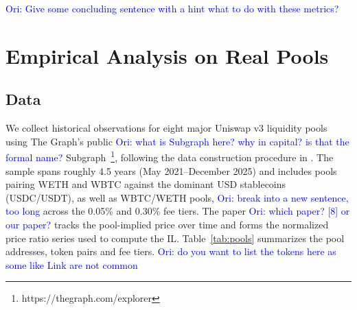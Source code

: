 \documentclass[journal]{IEEEtran}
\newcommand{\ori}[1]{\textcolor{blue}{Ori: #1}}
\begin{document}
\ori{Give some concluding sentence with a hint what to do with these metrics?}

\section{Empirical Analysis on Real Pools}
\label{sec:empirical_analysis}

\subsection{Data}


\begin{table}[t]
\centering
\scriptsize
{}
\caption{Summary of Uniswap v3 pools used in the empirical analysis.}
\label{tab:pools}
\end{table}


We collect historical observations for eight major Uniswap v3 liquidity pools using The Graph's public \ori{what is Subgraph here? why in capital? is that the formal name?} Subgraph~\footnote{https://thegraph.com/explorer}, following the data construction procedure in \cite{loesch2021impermanent}. 
The sample spans roughly 4.5 years (May 2021--December 2025) and includes pools pairing WETH and WBTC against the dominant USD stablecoins (USDC/USDT), as well as WBTC/WETH pools, \ori{break into a new sentence, too long} across the 0.05\% and 0.30\% fee tiers. 
The paper \ori{which paper? [8] or our paper?} tracks the pool-implied price over time and forms the normalized price ratio series used to compute the IL. 
Table~\ref{tab:pools} summarizes the pool addresses, token pairs and fee tiers. \ori{do you want to list the tokens here as some like Link are not common}
\end{document}
